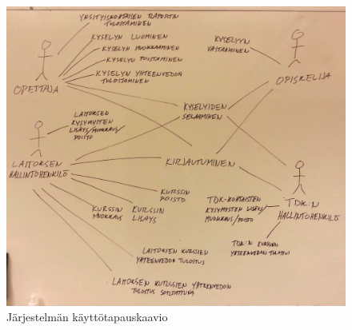 \documentclass[12pt,a4paper,titlepage]{article}
\begin{document}
\begin{figure}
   \centering
   \includegraphics[width=\textwidth]{kuvat/kayttotapauskaavio.jpg}
   \caption{Järjestelmän käyttötapauskaavio}\label{fig:kayttotapauskaavio}
\end{figure}
\end{document}
